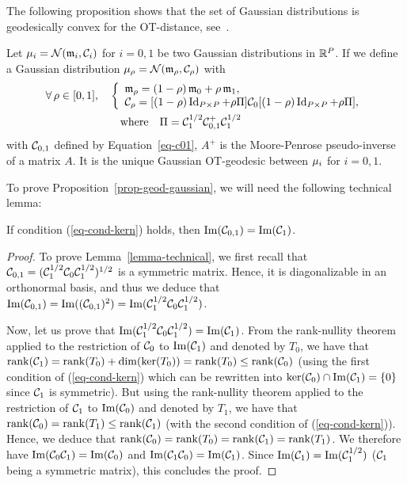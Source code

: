The following proposition shows that the set of Gaussian distributions is geodesically convex for the OT-distance, see~\cite{takatsu-wasserstein-gaussian}.

\begin{proposition}\label{prop-geod-gaussian}
Let $\mu_i=\mathcal{N}({\frak m}_i,\mathcal{C}_i)$ for $i=0,1$ be two Gaussian distributions in $\mathbb{R}^P$. 
If 
we define a Gaussian distribution $\mu_\rho = \mathcal{N}({\frak m}_\rho,\mathcal{C}_\rho)$ with
\begin{align}\label{eq-geodesic-ot}
	\foralls \rho \in [0,1], \quad &
	\choice{
		    \Mean_\rho = (1-\rho) \, \Mean_0 + \rho \, \Mean_1, \\
			\Cov_\rho = [ (1-\rho) \Id_{P \times P} + \rho \Pi ]\Cov_0[ (1-\rho)\Id_{P \times P} + \rho \Pi ],
	} \\
	\label{eq-dfn-pi}
	&\qwhereq 	\Pi =  \Cov_1^{1/2} \Cov_{0,1}^+ \Cov_1^{1/2}
\end{align}
with $\mathcal{C}_{0,1}$ defined by Equation~\eqref{eq-c01}, $A^+$ is the Moore-Penrose pseudo-inverse of a matrix $A$. It is the unique Gaussian OT-geodesic between $\mu_i$ for $i=0,1$.
\end{proposition}

To prove Proposition~\ref{prop-geod-gaussian}, we will need the following technical lemma:
\begin{lemma} \label{lemma-technical}
If  condition (\ref{eq-cond-kern}) holds, 
then $\operatorname{Im}(\mathcal{C}_{0,1}) = \operatorname{Im}(\mathcal{C}_1)$.
\end{lemma}

\begin{proof}
To prove Lemma~\ref{lemma-technical}, we first recall that $\mathcal{C}_{0,1} =  ( \mathcal{C}_1^{1/2} \mathcal{C}_0 \mathcal{C}_1^{1/2} )^{1/2}$ is a symmetric matrix. Hence, it is diagonalizable in an orthonormal basis, and thus we deduce that $\operatorname{Im}(\mathcal{C}_{0,1})=\operatorname{Im}((\mathcal{C}_{0,1})^2)=\operatorname{Im}( \mathcal{C}_1^{1/2} \mathcal{C}_0 \mathcal{C}_1^{1/2})$.

Now, let us prove that $\operatorname{Im}( \mathcal{C}_1^{1/2} \mathcal{C}_0 \mathcal{C}_1^{1/2})=\operatorname{Im}(\mathcal{C}_1)$.
From the rank-nullity theorem applied to the restriction of $\mathcal{C}_0$ to $\operatorname{Im}(\mathcal{C}_1)$ and denoted by $T_0$, we have that $\rank(\Cov_1) = \rank (T_0) + \dim(\ker(T_0))= \rank (T_0) \leq \rank(\Cov_0)$ (using the first condition of (\ref{eq-cond-kern}) which can be rewritten into $\ker(\mathcal{C}_0) \cap \operatorname{Im}(\mathcal{C}_1) = \{0\}$ since $\mathcal{C}_1$ is symmetric).
But using the rank-nullity theorem applied to the restriction of $\mathcal{C}_1$ to $\operatorname{Im}(\mathcal{C}_0)$ and denoted by $T_1$, we have that $\rank(\Cov_0) =  \rank (T_1) \leq \rank(\Cov_1)$ (with the second condition of (\ref{eq-cond-kern})).
Hence, we deduce that $\rank(\Cov_0) =  \rank (T_0)= \rank(\Cov_1)=  \rank (T_1)$.
We therefore have $ \operatorname{Im}(\mathcal{C}_0 \mathcal{C}_1)=\operatorname{Im}( \mathcal{C}_0)$ and  $ \operatorname{Im}(\mathcal{C}_1 \mathcal{C}_0)=\operatorname{Im}( \mathcal{C}_1)$.
Since $\operatorname{Im}(\mathcal{C}_1)=\operatorname{Im}(\mathcal{C}_1^{1/2})$ ($\mathcal{C}_1$ being a symmetric matrix), this concludes the proof.

\end{proof}


